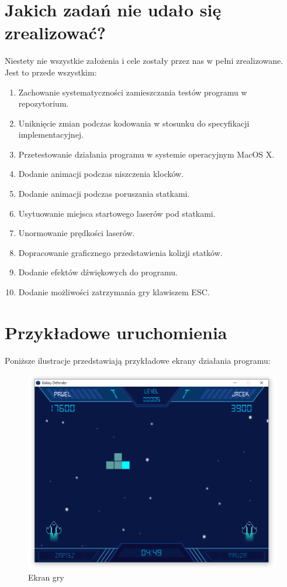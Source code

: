 \documentclass[a4paper]{article}
\begin{document}
\section{Jakich zadań nie udało się zrealizować?}
Niestety nie wszystkie założenia i cele zostały przez nas w pełni zrealizowane. Jest to przede wszystkim:
\begin{enumerate}
    \item Zachowanie systematyczności zamieszczania testów programu w repozytorium.
    \item Uniknięcie zmian podczas kodowania w stosunku do specyfikacji implementacyjnej.
    \item Przetestowanie działania programu w systemie operacyjnym MacOS X.
    \item Dodanie animacji podczas niszczenia klocków.
    \item Dodanie animacji podczas poruszania statkami.
    \item Usytuowanie miejsca startowego laserów pod statkami.
    \item Unormowanie prędkości laserów.
    \item Dopracowanie graficznego przedstawienia kolizji statków.
    \item Dodanie efektów dźwiękowych do programu.
    \item Dodanie możliwości zatrzymania gry klawiszem ESC.
\end{enumerate}

\section{Przykładowe uruchomienia}
Poniższe ilustracje przedstawiają przykładowe ekrany działania programu:
\begin{figure}[H]
    \centering
    \includegraphics[width=1\textwidth]{img/ekran-gry-screenshot.png}
    \caption{Ekran gry}
    \label{fig:game}
\end{figure}
\end{document}
